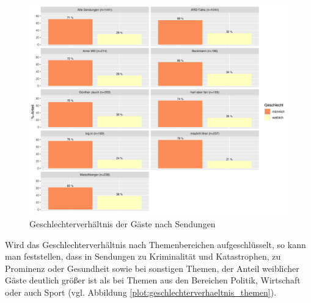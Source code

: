 \begin{figure}[ht]
	\centering
	\includegraphics[width=1\textwidth]{daten/grafiken/plot_geschlechterverhaeltnis_sendungen.png}
	\caption{Geschlechterverhältnis der Gäste nach Sendungen}
	\label{plot:geschlechterverhaeltnis_sendungen}
\end{figure}

Wird das Geschlechterverhältnis nach Themenbereichen aufgeschlüsselt, so kann man feststellen, dass in Sendungen zu Kriminalität und Katastrophen, zu Prominenz oder Gesundheit sowie bei sonstigen Themen, der Anteil weiblicher Gäste deutlich größer ist als bei Themen aus den Bereichen Politik, Wirtschaft oder auch Sport (vgl. Abbildung \vref{plot:geschlechterverhaeltnis_themen}).

